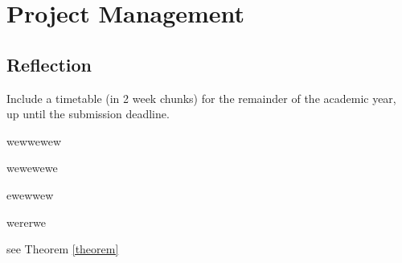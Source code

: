 \chapter{Project Management}
\section{Reflection}

Include a timetable (in 2 week chunks) for the remainder of the academic year, up until the submission deadline.
\begin{definition}
    wewwewew
\end{definition}
\begin{theorem}\label{theorem}
    wewewewe
\end{theorem}
\begin{example}
    ewewwew
\end{example}
\begin{conjecture}
    wererwe
\end{conjecture} \label{conje}
\begin{remark}
    see Theorem \ref{theorem}
\end{remark}
